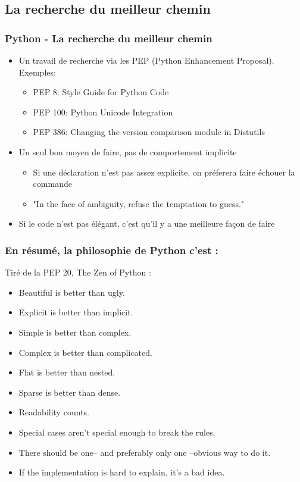\subsection{La recherche du meilleur chemin}
\begin{frame}
\frametitle{Python - La recherche du meilleur chemin}
  \begin{itemize}
    \item Un travail de recherche via les PEP (Python Enhancement Proposal). Exemples:
    \begin{itemize}
      \item PEP 8: Style Guide for Python Code
      \item PEP 100: Python Unicode Integration
      \item PEP 386: Changing the version comparison module in Distutils
    \end{itemize}
    \pause
    \item Un seul bon moyen de faire, pas de comportement implicite
    \begin{itemize}
      \item Si une déclaration n'est pas assez explicite, on préferera faire échouer la commande
      \item "In the face of ambiguity, refuse the temptation to guess."
    \end{itemize}
    \pause
    \item Si le code n'est pas élégant, c'est qu'il y a une meilleure façon de faire
  \end{itemize}
\end{frame}

\begin{frame}[fragile]
\frametitle{En résumé, la philosophie de Python c'est :}
Tiré de la PEP 20, The Zen of Python :
  \begin{itemize}
    \item Beautiful is better than ugly.
    \item Explicit is better than implicit.
    \item Simple is better than complex.
    \item Complex is better than complicated.
    \item Flat is better than nested.
    \item Sparse is better than dense.
    \item Readability counts.
    \item Special cases aren't special enough to break the rules.
    \item There should be one-- and preferably only one --obvious way to do it.
    \item If the implementation is hard to explain, it's a bad idea.
  \end{itemize}
\end{frame}
